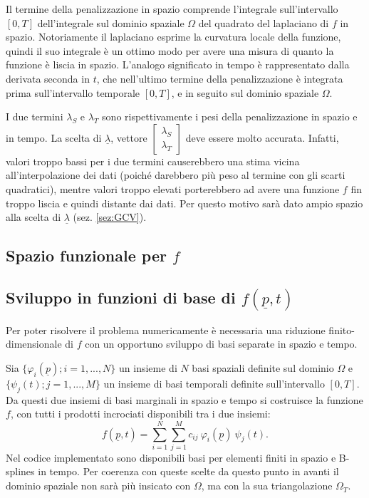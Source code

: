 \documentclass[a4paper,11pt,twoside,openright]{book}							%
\begin{document}
Il termine della penalizzazione in spazio comprende l'integrale sull'intervallo $[0,T]$ dell'integrale sul dominio spaziale $\Omega$ del quadrato del laplaciano di $f$ in spazio. Notoriamente il laplaciano esprime la curvatura locale della funzione, quindi il suo integrale è un ottimo modo per avere una misura di quanto la funzione è liscia in spazio. L'analogo significato in tempo è rappresentato dalla derivata seconda in $t$, che nell'ultimo termine della penalizzazione è integrata prima sull'intervallo temporale $[0,T]$, e in seguito sul dominio spaziale $\Omega$.

I due termini $\lambda_S$ e $\lambda_T$ sono rispettivamente i pesi della penalizzazione in spazio e in tempo. La scelta di $\underline \lambda$, vettore $ \begin{bmatrix}
\lambda_S \\ \lambda_T
\end{bmatrix}$ deve essere molto accurata. Infatti, valori troppo bassi per i due termini causerebbero una stima vicina all'interpolazione dei dati (poiché darebbero più peso al termine con gli scarti quadratici), mentre valori troppo elevati porterebbero ad avere una funzione $f$ fin troppo liscia e quindi distante dai dati. Per questo motivo sarà dato ampio spazio alla scelta di $\underline \lambda$ (sez. \ref{sez:GCV}).

\subsection*{Spazio funzionale per $f$}

\subsection*{Sviluppo in funzioni di base di $f(\underline p,t)$}

Per poter risolvere il problema numericamente è necessaria una riduzione finito-dimensionale di $f$ con un opportuno sviluppo di basi separate in spazio e tempo.

Sia $\{\varphi_i(\underline p); i=1, ... , N\}$ un insieme di $N$ basi spaziali definite sul dominio $\Omega$ e $\{\psi_j(t); j=1, ... , M\}$ un insieme di basi temporali definite sull'intervallo $[0,T]$. Da questi due insiemi di basi marginali in spazio e tempo si costruisce la funzione $f$, con tutti i prodotti incrociati disponibili tra i due insiemi:
\begin{equation} 
\label{eq:basisexp}
f(\underline p,t)=\sum_{i=1}^N \sum_{j=1}^M c_{ij}\ \varphi_i(\underline p)\ \psi_j(t) .
\end{equation}
Nel codice implementato sono disponibili basi per elementi finiti in spazio e B-splines in tempo. Per coerenza con queste scelte da questo punto in avanti il dominio spaziale non sarà più insicato con $\Omega$, ma con la sua triangolazione $\Omega_T$.
\end{document}

